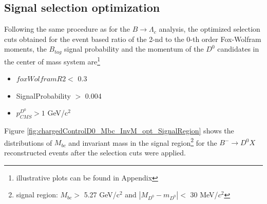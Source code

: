    \subsection{Signal selection optimization}\label{Sec:SigSelectionOpt}

   Following the same procedure as for the $B \rightarrow \Lambda_c$ analysis, the optimized selection cuts obtained for the event based ratio
   of the 2-nd to the 0-th order Fox-Wolfram moments, the $B_{tag}$ signal probability and the momentum of the $D^0$ candidates in the center of mass system are\footnote{illustrative plots can be found in Appendix}
   \begin{itemize}
    \item $foxWolframR2 <$ 0.3
    \item SignalProbability $>$ 0.004
    \item $p^{D^0 }_{CMS} > 1$ GeV/c$^2$
    \end{itemize}
    
     \noindent Figure \ref{fig:chargedControlD0_Mbc_InvM_opt_SignalRegion} shows the distributions of $M_{bc}$ and invariant mass in the signal region\footnote{signal region: $M_{bc}  > $ 5.27 GeV/c$^2$ and $|M_{D^0}  - m_{D^0}| < $   30  MeV/$c^2$}  for the $B^- \rightarrow D^0 X$ reconstructed events after the selection cuts were applied.
    